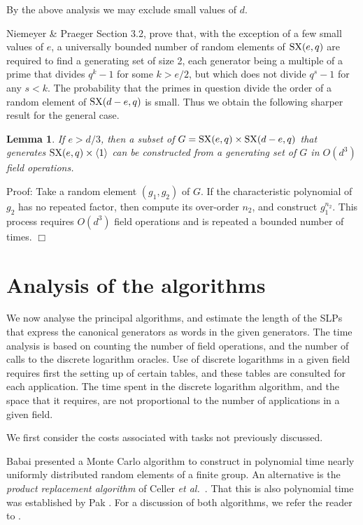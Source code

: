 \documentclass[12pt]{article}
\newtheorem{lemma}[definition]{Lemma}
\newenvironment{proof}{\normalsize {\sc Proof}:}{{\hfill $\Box$ \\}}
\def\SX{{\rm SX}}
\begin{document}
By the above analysis we may exclude small values of $d$.

Niemeyer \& Praeger \cite{NP} Section 3.2, prove that,
with the exception of a few
small values of $e$, a universally  bounded number of random elements
of $\SX(e,q)$ are required to find a generating set of size 2, each
generator being a multiple of a prime that divides $q^k-1$ for some
$k>e/2$, but which does not divide $q^s-1$ for any $s<k$. The
probability that the primes in question divide the order of a random
element of $\SX(d-e,q)$ is small. Thus we obtain the following
sharper result for the general case.
\begin{lemma} If $e>d/3$, then a subset of $G=\SX(e,q)\times\SX(d-e,q)$    
that generates $\SX(e,q)\times\langle1\rangle$ can be constructed  
from a generating set of $G$ in $O(d^3)$ field operations.
\end{lemma}
\begin{proof} 
Take a random element $(g_1,g_2)$ of $G$. If the
characteristic polynomial of $g_2$ has no repeated factor, then compute its
over-order $n_2$, and construct $g_1^{n_2}$. This process requires
$O(d^3)$ field operations and is repeated a bounded number of times.
\end{proof}

\section{Analysis of the algorithms} 
\label{Analysis}
We now analyse the principal
algorithms, and estimate the length of the SLPs
that express the canonical generators as words in  the given
generators. The time analysis is based on counting the number of
field operations, and the number of calls to 
the discrete logarithm oracles. Use of discrete
logarithms in a given field requires first the setting up of certain
tables, and these tables are consulted for each application. The
time spent in the discrete logarithm algorithm, and the space that it
requires, are  not proportional to the number of applications in a
given field.

We first consider the costs associated with tasks 
not previously discussed.

Babai \cite{Babai91} presented a Monte Carlo algorithm to
construct in polynomial time nearly uniformly distributed 
random elements of a finite group.  An alternative is the 
{\it product replacement algorithm} of Celler
{\it et al.\ }\cite{Celleretal95}.
That this is also polynomial time was
established by Pak \cite{Pak00}.
For a discussion of both algorithms, we refer
the reader to \cite[pp.\ 26-30]{Seress03}.
\end{document}
